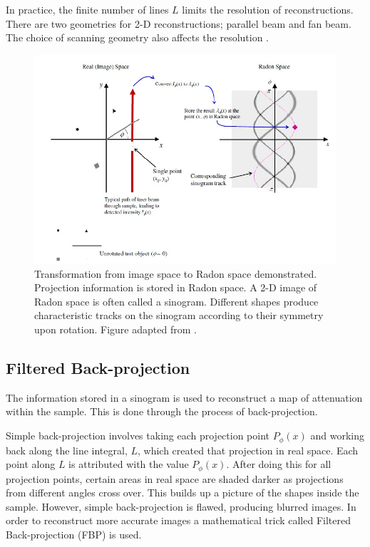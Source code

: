 \documentclass[12pt]{article}
\begin{document}
In practice, the finite number of lines $L$ limits the resolution of reconstructions. There are two geometries for 2-D reconstructions; parallel beam and fan beam. The choice of scanning geometry also affects the resolution \cite{natterer2001mathematics}.

\begin{figure}[H]
\centering
\includegraphics[width=\textwidth]{Doran_2008_sinogram.jpg}
\caption{Transformation from image space to Radon space demonstrated. Projection information is stored in Radon space. A 2-D image of Radon space is often called a sinogram. Different shapes produce characteristic tracks on the sinogram according to their symmetry upon rotation. Figure adapted from \cite{Doran:2008kh}.}
\label{fig:sinogram}
\end{figure}







\subsection{Filtered Back-projection}
\label{subsec:FBP}

The information stored in a sinogram is used to reconstruct a map of attenuation within the sample. This is done through the process of back-projection.

Simple back-projection involves  taking each projection point $P_{\phi}(x)$ and working back along the line integral, $L$, which created that projection in real space. Each point along $L$ is  attributed with the value $P_{\phi}(x)$. After doing this for all projection points, certain areas in real space are shaded darker as projections from different angles cross over. This builds up a picture of the shapes inside the sample. However, simple back-projection is flawed, producing blurred images. In order to reconstruct more accurate images a mathematical trick called Filtered Back-projection (FBP) is used.
\end{document}
